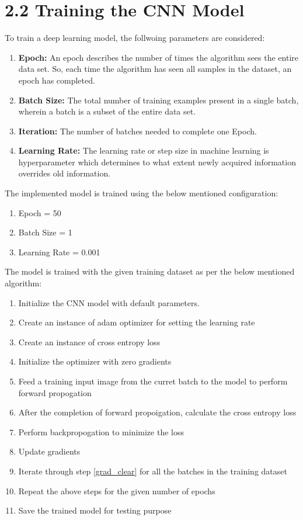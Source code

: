 \documentclass[12pt]{report}
\begin{document}
\section*{2.2 Training the CNN Model}
To train a deep learning model, the follwoing parameters are considered:
\begin{enumerate}
	\item \textbf{Epoch:} An epoch describes the number of times the algorithm sees the entire data set. So, each time the algorithm has seen all samples in the dataset, an epoch has completed.
	\item \textbf{Batch Size:} The total number of training examples present in a single batch, wherein a batch is a subset of the entire data set. 
	\item \textbf{Iteration:} The number of batches needed to complete one Epoch.
	\item \textbf{Learning Rate:} The learning rate or step size in machine learning is hyperparameter which determines to what extent newly acquired information overrides old information.	
\end{enumerate}

The implemented model is trained using the below mentioned configuration:
\begin{enumerate}
	\item Epoch = 50	
	\item Batch Size = 1
	\item Learning Rate = 0.001
\end{enumerate}

The model is trained with the given training dataset as per the below mentioned algorithm:
\begin{enumerate}
	\item Initialize the CNN model with default parameters. 
	\item Create an instance of adam optimizer for setting the learning rate
	\item Create an instance of cross entropy loss
	\item Initialize the optimizer with zero gradients \label{grad_clear}
	\item Feed a training input image from the curret batch to the model to perform forward propogation
	\item After the completion of forward propoigation, calculate the cross entropy loss
	\item Perform backpropogation to minimize the loss
	\item Update gradients
	\item Iterate through step \ref{grad_clear} for all the batches in the training dataset
	\item Repeat the above steps for the given number of epochs
	\item Save the trained model for testing purpose
	
\end{enumerate}
\end{document}
